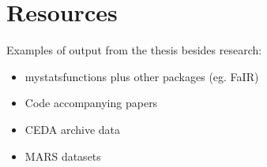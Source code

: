 \section{Resources}

Examples of output from the thesis besides research:
\begin{itemize}
    \item mystatsfunctions plus other packages (eg. FaIR)
    \item Code accompanying papers
    \item CEDA archive data
    \item MARS datasets
\end{itemize}